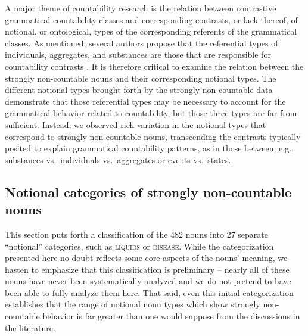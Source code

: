 \documentclass[output=paper]{langscibook}
\begin{document}
A major theme of countability research is the relation between contrastive grammatical countability classes and corresponding contrasts, or lack thereof, of notional, or ontological, types of the corresponding referents of the grammatical classes.  %
As mentioned, several authors propose that the referential types of individuals, aggregates, and substances are those that are responsible for countability contrasts \citep{Bale2009,Chierchia2010,Deal2016}. It is therefore critical to examine the relation between the strongly non-countable nouns and their corresponding notional types.   The different notional types brought forth by the strongly non-countable data demonstrate that those referential types may be necessary to account for the grammatical behavior related to countability, but those three types are far from sufficient.  Instead, we observed rich variation in the notional types that correspond to strongly non-countable nouns, transcending the contrasts typically  posited to explain grammatical countability patterns, as in those between, e.g., substances vs.~individuals vs.~aggregates or events vs.~states.  




\subsection{Notional categories of strongly non-countable nouns}

This section puts forth a classification of the 482 nouns into 27 separate ``notional'' categories, such as \textsc{liquids} or \textsc{disease}.    While the categorization presented here no doubt reflects some core aspects of the nouns' meaning, we hasten to emphasize that this classification is preliminary -- nearly all of these nouns have never been systematically analyzed and we do not pretend to have been able to fully analyze them here.  That said, even this initial categorization establishes  that the range of notional noun types which show strongly non-countable behavior is far greater than one would suppose from the discussions in the literature.  %
\end{document}
